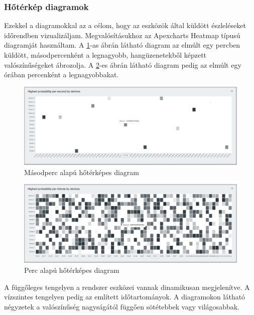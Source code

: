 \subsubsection{Hőtérkép diagramok}
Ezekkel a diagramokkal az a célom, hogy az eszközök által küldött észleléseket időrendben vizualizáljam.
Megvalósításukhoz az Apexcharts Heatmap típusú diagramját használtam.
A \ref{fig:dashboard-heatmap-second}-as ábrán látható diagram az elmúlt egy percben küldött, másodpercenként a legnagyobb, hangüzenetekből képzett valószínűségeket ábrozolja.
A \ref{fig:dashboard-heatmap-minute}-es ábrán látható diagram pedig az elmúlt egy órában percenként a legnagyobbakat.
\begin{figure}[!ht]
    \centering
    \includegraphics[width=150mm, keepaspectratio]{figures/second-heatmap.png}
    \caption{Másodperc alapú hőtérképes diagram}
    \label{fig:dashboard-heatmap-second}
\end{figure}
\begin{figure}[!ht]
    \centering
    \includegraphics[width=150mm, keepaspectratio]{figures/minute-heatmap.png}
    \caption{Perc alapú hőtérképes diagram}
    \label{fig:dashboard-heatmap-minute}
\end{figure}

A függőleges tengelyen a rendszer eszközei vannak dinamikusan megjelenítve.
A vízszintes tengelyen pedig az említett időtartományok.
A diagramokon látható négyzetek a valószínűség nagyságától függően sötétebbek vagy világosabbak.
\newpage
